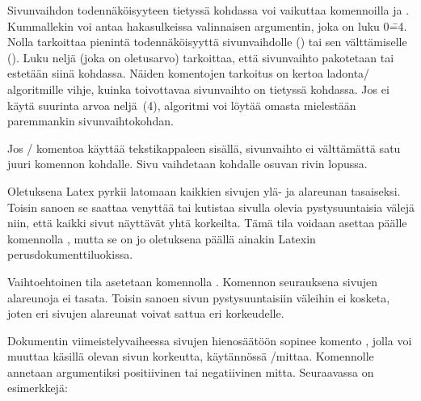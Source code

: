 Sivunvaihdon todennäköisyyteen tietyssä kohdassa voi vaikuttaa
komennoilla  ja . Kummallekin
voi antaa hakasulkeissa valinnaisen argumentin, joka on luku 0\==4.
Nolla tarkoittaa pienintä todennäköisyyttä sivunvaihdolle
() tai sen välttämiselle
(). Luku neljä (joka on oletusarvo)
tarkoittaa, että sivunvaihto pakotetaan tai estetään siinä kohdassa.
Näiden komentojen tarkoitus on kertoa ladonta\-/ algoritmille vihje,
kuinka toivottavaa sivunvaihto on tietyssä kohdassa. Jos ei käytä
suurinta arvoa neljä~(4), algoritmi voi löytää omasta mielestään
paremmankin sivunvaihtokohdan.

\begin{koodilohkosis}
\pagebreak[3]  %
\nopagebreak   %
\end{koodilohkosis}

\noindent
Jos \-/ komentoa käyttää tekstikappaleen sisällä,
sivunvaihto ei välttämättä satu juuri komennon kohdalle. Sivu vaihdetaan
kohdalle osuvan rivin lopussa.

Oletuksena Latex pyrkii latomaan kaikkien sivujen ylä- ja alareunan
tasaiseksi. Toisin sanoen se saattaa venyttää tai kutistaa sivulla
olevia pystysuuntaisia välejä niin, että kaikki sivut näyttävät yhtä
korkeilta. Tämä tila voidaan asettaa päälle komennolla
, mutta se on jo oletuksena päällä ainakin Latexin
perusdokumenttiluokissa.

Vaihtoehtoinen tila asetetaan komennolla .
Komennon seurauksena sivujen alareunoja ei tasata. Toisin sanoen sivun
pystysuuntaisiin väleihin ei kosketa, joten eri sivujen alareunat voivat
sattua eri korkeudelle.

Dokumentin viimeistelyvaiheessa sivujen hienosäätöön sopinee komento
, jolla voi muuttaa käsillä olevan sivun
korkeutta, käytännössä \-/mittaa. Komennolle annetaan
argumentiksi positiivinen tai negatiivinen mitta. Seuraavassa on
esimerkkejä:

\begin{koodilohkosis}
\enlargethispage{12bp}          %
\enlargethispage{-4bp}          %
\enlargethispage{\baselineskip} %
\end{koodilohkosis}

